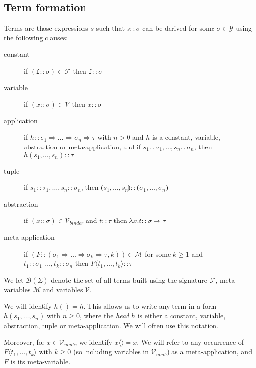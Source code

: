 \documentclass{lmcs}
\theoremstyle{theorem}\newtheorem{theorem}{Theorem}
\theoremstyle{theorem}\newtheorem{lemma}[theorem]{Lemma}
\theoremstyle{theorem}\newtheorem{corollary}[theorem]{Corollary}
\theoremstyle{definition}\newtheorem{definition}[theorem]{Definition}
\theoremstyle{definition}\newtheorem{example}[theorem]{Example}
\newcommand{\F}{\mathcal{F}}
\newcommand{\V}{\mathcal{V}}
\newcommand{\M}{\mathcal{M}}
\newcommand{\Vfree}{\mathcal{V}_{\mathit{nonb}}}
\newcommand{\Vbound}{\mathcal{V}_{\mathit{binder}}}
\newcommand{\Types}{\mathcal{Y}}
\newcommand{\MTerms}{\mathcal{B}}
\newcommand{\atype}{\sigma}
\newcommand{\btype}{\tau}
\newcommand{\identifier}[1]{\mathtt{#1}}
\newcommand{\afun}{\identifier{f}}
\newcommand{\avar}{x}
\newcommand{\ameta}{F}
\newcommand{\abs}[2]{\lambda #1.#2}
\newcommand{\meta}[2]{#1\langle#2\rangle}
\newcommand{\tuple}[2]{\llparenthesis #1,\dots,#2 \rrparenthesis}
\newcommand{\product}[2]{\llparenthesis #1,\dots,#2 \rrparenthesis}
\newcommand{\arrtype}{\Rightarrow}
\begin{document}
\subsection{Term formation}\label{subsec:form}

Terms are those expressions $s$ such that $s :: \atype$ can be derived for some
$\atype \in \Types$ using the following clauses:

\begin{description}
\item[constant] if $(\afun :: \atype) \in \F$ then $\afun :: \atype$
\item[variable] if $(\avar :: \atype) \in \V$ then $\avar :: \atype$
\item[application] if $h :: \atype_1 \arrtype \dots \arrtype \atype_n \arrtype
  \btype$ with $n > 0$ and $h$ is a constant, variable, abstraction or
  meta-application, and if $s_1 :: \atype_1,\dots,s_n :: \atype_n$,
  then $h(s_1,\dots,s_n) :: \btype$
\item[tuple] if $s_1 :: \atype_1,\dots,s_n :: \atype_n$, then
  $\tuple{s_1}{s_n} :: \product{\atype_1}{\atype_n}$
\item[abstraction] if $(\avar :: \atype) \in \Vbound$ and $t :: \btype$ then
  $\abs{\avar}{t} :: \atype \arrtype \btype$
\item[meta-application] if $(\ameta :: (\atype_1 \arrtype \dots \arrtype
  \atype_k \arrtype \btype,k)) \in \M$ for some $k \geq 1$ and $t_1 :: \atype_1,
  \dots,t_k :: \atype_n$ then $\meta{\ameta}{t_1,\dots,t_k} :: \btype$
\end{description}

We let $\MTerms(\Sigma)$ denote the set of all terms built using the signature
$\F$, meta-variables $\M$ and variables $\V$.

We will identify $h() = h$.  This allows us to write any term in a form $h(s_1,
\dots,s_n)$ with $n \geq 0$, where the \emph{head} $h$ is either a constant,
variable, abstraction, tuple or meta-application.  We will often use this notation.

Moreover, for $\avar \in \Vfree$, we identify $\meta{\avar}{} = \avar$.  We will
refer to any occurrence of $\meta{\ameta}{t_1,\dots,t_k}$ with $k \geq 0$ (so
including variables in $\Vfree$) as a meta-application, and $\ameta$ is its
meta-variable.
\end{document}
